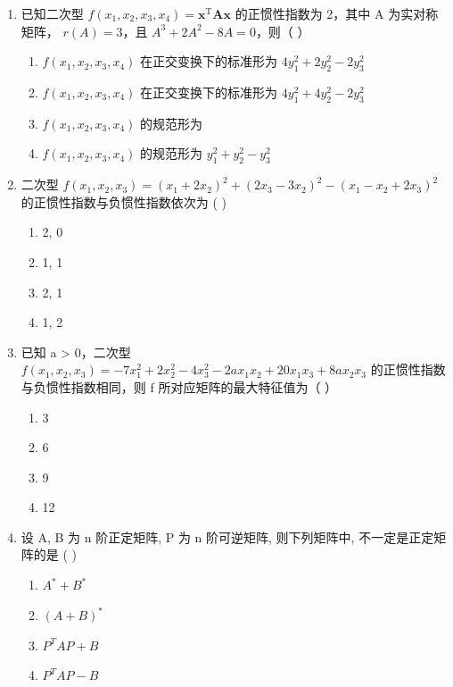 \documentclass[12pt, a4paper]{ctexart}
\begin{document}
\begin{enumerate}
    \item 已知二次型 $ f(x_1, x_2, x_3, x_4) = \mathbf{x}^\mathrm{T} \mathbf{A} \mathbf{x} $ 的正惯性指数为 2，其中 A 为实对称矩阵， $ r(A) = 3 $，且 $ A^3 + 2A^2 - 8A = 0 $，则（ \underline{\hspace{1cm}} ）
    \begin{enumerate}[label=(\Alph*)]
        \item $ f(x_{1},x_{2},x_{3},x_{4}) $ 在正交变换下的标准形为 $ 4y_{1}^{2}+2y_{2}^{2}-2y_{3}^{2} $
        \item $ f(x_{1},x_{2},x_{3},x_{4}) $ 在正交变换下的标准形为 $ 4y_{1}^{2}+4y_{2}^{2}-2y_{3}^{2} $
        \item $ f(x_{1},x_{2},x_{3},x_{4}) $ 的规范形为
        \item $ f(x_{1},x_{2},x_{3},x_{4}) $ 的规范形为 $ y_{1}^{2}+y_{2}^{2}-y_{3}^{2} $
    \end{enumerate}

    \item 二次型 $ f(x_{1},x_{2},x_{3})=(x_{1}+2x_{2})^{2}+(2x_{3}-3x_{2})^{2}-(x_{1}-x_{2}+2x_{3})^{2} $ 的正惯性指数与负惯性指数依次为 ( \underline{\hspace{1cm}} )
    \begin{enumerate}[label=(\Alph*)]
        \item 2, 0
        \item 1, 1
        \item 2, 1
        \item 1, 2
    \end{enumerate}

    \item 已知 a > 0，二次型 $ f(x_{1}, x_{2}, x_{3}) = -7x_{1}^{2} + 2x_{2}^{2} - 4x_{3}^{2} - 2ax_{1}x_{2} + 20x_{1}x_{3} + 8ax_{2}x_{3} $ 的正惯性指数与负惯性指数相同，则 f 所对应矩阵的最大特征值为（ \underline{\hspace{1cm}} ）
    \begin{enumerate}[label=(\Alph*)]
        \item 3
        \item 6
        \item 9
        \item 12
    \end{enumerate}

    \item 设 A, B 为 n 阶正定矩阵, P 为 n 阶可逆矩阵, 则下列矩阵中, 不一定是正定矩阵的是 ( \underline{\hspace{1cm}} )
    \begin{enumerate}[label=(\Alph*)]
        \item $ A^{*} + B^{*} $
        \item $ (A + B)^{*} $
        \item $ P^{T}AP + B $
        \item $ P^{T}AP - B $
    \end{enumerate}


\end{enumerate}
\end{document}
